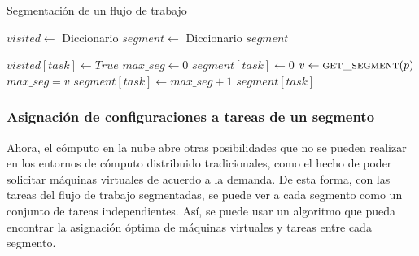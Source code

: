 \begin{algorithm}
\caption{Segmentación de un flujo de trabajo}
\label{alg_blind_segments}
\begin{algorithmic}[1]
	\State $visited \gets$ Diccionario
	\State $segment \gets$ Diccionario
		\State {}
	\EndFor
	\State \Return $segment$
\EndProcedure

	\State $visited[task] \gets True$
	\State $max\_seg \gets 0$
		\State $segment[task] \gets 0$
			\State $v \gets \Call{get\_segment}{p}$
				\State $max\_seg = v$
			\EndIf
		\EndFor
		\State $segment[task] \gets max\_seg + 1$
	\EndIf
	\State \Return $segment[task]$
\EndProcedure



		\Else
		\EndIf
	\EndFor
\EndProcedure	
\end{algorithmic}
\end{algorithm}

\subsubsection{Asignación de configuraciones a tareas de un segmento}

Ahora, el cómputo en la nube abre otras posibilidades que no se pueden realizar en los entornos de cómputo distribuido tradicionales, como el hecho de poder solicitar máquinas virtuales de acuerdo a la demanda. De esta forma, con las tareas del flujo de trabajo segmentadas, se puede ver a cada segmento como un conjunto de tareas independientes. Así, se puede usar un algoritmo que pueda encontrar la asignación óptima de máquinas virtuales y tareas entre cada segmento.

